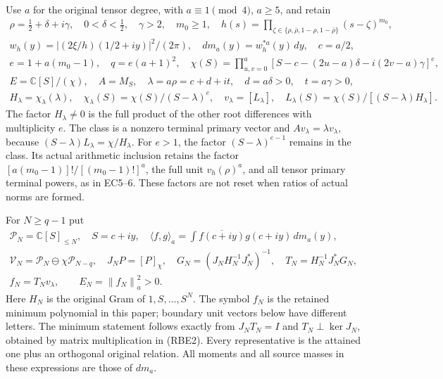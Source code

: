\documentclass[11pt]{article}
\newcommand{\C}{\mathbb C}\newcommand{\R}{\mathbb R}
\newcommand{\PP}{\mathcal P}
\newcommand{\norm}[1]{\left\lVert#1\right\rVert}
\begin{document}
Use \(a\) for the original tensor degree, with
\(a\equiv1\pmod4\), \(a\ge5\), and retain
\begin{equation}\tag{RBE1}
\begin{gathered}
 \rho=\tfrac12+\delta+i\gamma,\quad0<\delta<\tfrac12,\quad
 \gamma>2,\quad m_0\ge1,\quad
 h(s)=\prod_{\zeta\in\{\rho,\bar\rho,1-\rho,1-\bar\rho\}}
                       (s-\zeta)^{m_0},\\
 w_h(y)=|(2\xi/h)(1/2+iy)|^2/(2\pi),\quad
 dm_a(y)=w_h^{*a}(y)\,dy,\quad c=a/2,\\
 e=1+a(m_0-1),\quad q=e(a+1)^2,\quad
 \chi(S)=\prod_{u,v=0}^a
 [S-c-(2u-a)\delta-i(2v-a)\gamma]^e,\\
 E=\C[S]/(\chi),\quad A=M_S,\quad
 \lambda=a\rho=c+d+it,\quad d=a\delta>0,\quad t=a\gamma>0,\\
 H_\lambda=\chi_\lambda(\lambda),\quad
 \chi_\lambda(S)=\chi(S)/(S-\lambda)^e,\quad
 v_\lambda=[L_\lambda],\quad
 L_\lambda(S)=\chi(S)/[(S-\lambda)H_\lambda].
\end{gathered}
\end{equation}
The factor \(H_\lambda\ne0\) is the full product of the other
root differences with multiplicity \(e\). The class is a nonzero
terminal primary vector and \(Av_\lambda=\lambda v_\lambda\),
because \((S-\lambda)L_\lambda=\chi/H_\lambda\).
For \(e>1\), the factor \((S-\lambda)^{e-1}\) remains in
the class. Its actual arithmetic inclusion retains the factor
\([a(m_0-1)]!/[(m_0-1)!]^a\), the full unit \(v_h(\rho)^a\),
and all tensor primary terminal powers, as in EC5--6. These factors
are not reset when ratios of actual norms are formed.

For \(N\ge q-1\) put
\begin{equation}\tag{RBE2}
 \begin{gathered}
 \PP_N=\C[S]_{\le N},\quad S=c+iy,\quad
 \langle f,g\rangle_a=\int\overline{f(c+iy)}g(c+iy)\,dm_a(y),\\
 \mathcal V_N=\PP_N\ominus\chi\PP_{N-q},\quad
 J_NP=[P]_\chi,\quad
 G_N=(J_NH_N^{-1}J_N^*)^{-1},\quad
 T_N=H_N^{-1}J_N^*G_N,\\
 f_N=T_Nv_\lambda,\qquad E_N=\norm{f_N}_a^2>0.
 \end{gathered}
\end{equation}
Here \(H_N\) is the original Gram of \(1,S,\ldots,S^N\).
The symbol \(f_N\) is the retained minimum polynomial in this
paper; boundary unit vectors below have different letters.
The minimum statement follows exactly from
\(J_NT_N=I\) and \(T_N\perp\ker J_N\), obtained by matrix
multiplication in (RBE2). Every representative is the attained
one plus an orthogonal original relation. All moments and all
source masses in these expressions are those of \(dm_a\).
\end{document}
